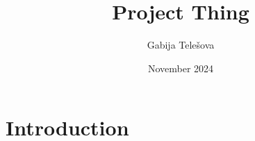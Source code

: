 \documentclass{article}
\title{Project Thing}
\author{Gabija Telešova}
\date{November 2024}
\begin{document}
\maketitle

\section{Introduction}
\end{document}

